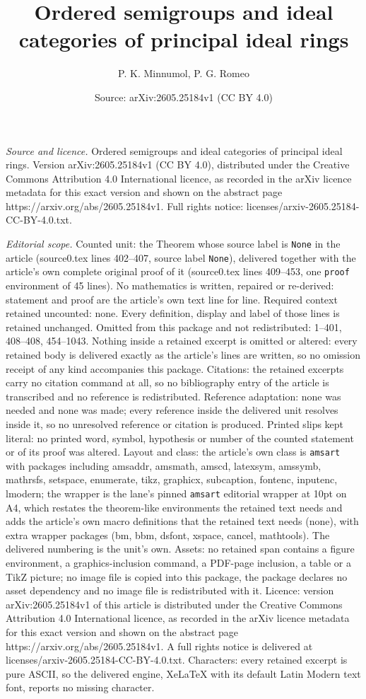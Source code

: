\documentclass[10pt,a4paper]{amsart}
\title[Ordered semigroups and ideal categories of principal ideal r]{Ordered semigroups and ideal categories of principal ideal rings}
\author{P. K. Minnumol, P. G. Romeo}
\date{Source: arXiv:2605.25184v1 (CC BY 4.0)}
\begin{document}
\maketitle

\noindent\emph{Source and licence.} Ordered semigroups and ideal categories of principal ideal rings. Version arXiv:2605.25184v1 (CC BY 4.0), distributed under the Creative Commons Attribution 4.0 International licence, as recorded in the arXiv licence metadata for this exact version and shown on the abstract page https://arxiv.org/abs/2605.25184v1. Full rights notice: licenses/arxiv-2605.25184-CC-BY-4.0.txt.\par\smallskip

\noindent\textit{Editorial scope.} Counted unit: the Theorem whose source label is \texttt{None} in the article (source0.tex lines 402--407, source label \texttt{None}), delivered together with the article's own complete original proof of it (source0.tex lines 409--453, one \texttt{proof} environment of 45 lines). No mathematics is written, repaired or re-derived: statement and proof are the article's own text line for line. Required context retained uncounted: none. Every definition, display and label of those lines is retained unchanged. Omitted from this package and not redistributed: 1--401, 408--408, 454--1043. Nothing inside a retained excerpt is omitted or altered: every retained body is delivered exactly as the article's lines are written, so no omission receipt of any kind accompanies this package. Citations: the retained excerpts carry no citation command at all, so no bibliography entry of the article is transcribed and no reference is redistributed. Reference adaptation: none was needed and none was made; every reference inside the delivered unit resolves inside it, so no unresolved reference or citation is produced. Printed slips kept literal: no printed word, symbol, hypothesis or number of the counted statement or of its proof was altered. Layout and class: the article's own class is \texttt{amsart} with packages including amsaddr, amsmath, amscd, latexsym, amssymb, mathrsfs, setspace, enumerate, tikz, graphicx, subcaption, fontenc, inputenc, lmodern; the wrapper is the lane's pinned \texttt{amsart} editorial wrapper at 10pt on A4, which restates the theorem-like environments the retained text needs and adds the article's own macro definitions that the retained text needs (none), with extra wrapper packages (bm, bbm, dsfont, xspace, cancel, mathtools). The delivered numbering is the unit's own. Assets: no retained span contains a figure environment, a graphics-inclusion command, a PDF-page inclusion, a table or a TikZ picture; no image file is copied into this package, the package declares no asset dependency and no image file is redistributed with it. Licence: version arXiv:2605.25184v1 of this article is distributed under the Creative Commons Attribution 4.0 International licence, as recorded in the arXiv licence metadata for this exact version and shown on the abstract page https://arxiv.org/abs/2605.25184v1. A full rights notice is delivered at licenses/arxiv-2605.25184-CC-BY-4.0.txt. Characters: every retained excerpt is pure ASCII, so the delivered engine, XeLaTeX with its default Latin Modern text font, reports no missing character.
\end{document}
